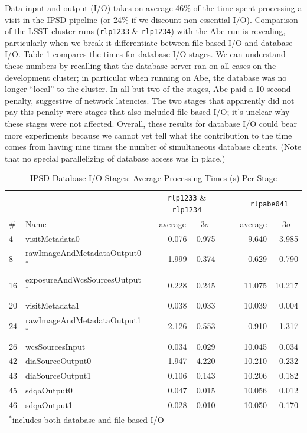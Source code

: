 Data input and output (I/O) takes on average 46\% of the time spent
processing a visit in the IPSD pipeline (or 24\% if we discount
non-essential I/O).  Comparison of the LSST cluster runs 
({\tt   rlp1233} \& {\tt rlp1234}) with the Abe run is revealing,
particularly when we break it differentiate between file-based I/O and
database I/O.  Table \ref{tbl:diostagetimes} compares the times for
database I/O stages.  We can understand these numbers by recalling
that the database server ran on all cases on the development cluster;
in particular when running on Abe, the database was no longer
``local'' to the cluster.  In all but two of the stages, Abe paid a
10-second penalty, suggestive of network latencies.  The two stages
that apparently did not pay this penalty were stages that also
included file-based I/O; it's unclear why these stages were not
affected.  Overall, these results for database I/O could bear more
experiments because we cannot yet tell what
the contribution to the time comes from having nine times the number
of simultaneous database clients.  (Note that no special parallelizing
of database access was in place.)

\begin{table}[hbtp]
\begin{center}
\caption{IPSD Database I/O Stages: Average Processing Times (s) Per Stage
\label{tbl:diostagetimes}}
\small
\vspace{\baselineskip}
\begin{tabular}{llcrrc|crr}
\hline\hline
   &      && \multicolumn{2}{c}{{\tt rlp1233} \& {\tt rlp1234}} 
         &&& \multicolumn{2}{c}{{\tt rlpabe041}} \\
\# & Name && \multicolumn{1}{c}{average}&\multicolumn{1}{c}{$3\sigma$} 
         &&& \multicolumn{1}{c}{average}&\multicolumn{1}{c}{$3\sigma$} \\ 
\hline
 4 &                 visitMetadata0 &&  0.076 &  0.975 &&&  9.640 &  3.985 \\
 8 &  rawImageAndMetadataOutput0$^*$&&  1.999 &  0.374 &&&  0.629 &  0.790 \\
16 & exposureAndWcsSourcesOutput$^*$&&  0.228 &  0.245 &&& 11.075 & 10.217 \\
20 &                 visitMetadata1 &&  0.038 &  0.033 &&& 10.039 &  0.004 \\
24 &  rawImageAndMetadataOutput1$^*$&&  2.126 &  0.553 &&&  0.910 &  1.317 \\
26 &                wcsSourcesInput &&  0.034 &  0.029 &&& 10.045 &  0.034 \\
42 &               diaSourceOutput0 &&  1.947 &  4.220 &&& 10.210 &  0.232 \\
43 &               diaSourceOutput1 &&  0.106 &  0.143 &&& 10.206 &  0.182 \\
45 &                    sdqaOutput0 &&  0.047 &  0.015 &&& 10.056 &  0.012 \\
46 &                    sdqaOutput1 &&  0.028 &  0.010 &&& 10.050 &  0.170 \\
\hline
\multicolumn{9}{l}{$^*$includes both database and file-based I/O}
\end{tabular}
\end{center}
\end{table}

